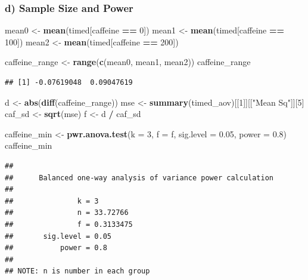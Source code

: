 \documentclass[
]{article}
\newenvironment{Shaded}{\begin{snugshade}}{\end{snugshade}}
\newcommand{\AttributeTok}[1]{\textcolor[rgb]{0.13,0.29,0.53}{#1}}
\newcommand{\DecValTok}[1]{\textcolor[rgb]{0.00,0.00,0.81}{#1}}
\newcommand{\FloatTok}[1]{\textcolor[rgb]{0.00,0.00,0.81}{#1}}
\newcommand{\FunctionTok}[1]{\textcolor[rgb]{0.13,0.29,0.53}{\textbf{#1}}}
\newcommand{\NormalTok}[1]{#1}
\newcommand{\OtherTok}[1]{\textcolor[rgb]{0.56,0.35,0.01}{#1}}
\newcommand{\SpecialCharTok}[1]{\textcolor[rgb]{0.81,0.36,0.00}{\textbf{#1}}}
\newcommand{\StringTok}[1]{\textcolor[rgb]{0.31,0.60,0.02}{#1}}
\begin{document}
\subsubsection{d) Sample Size and Power}\label{d-sample-size-and-power}

\begin{Shaded}
\begin{Highlighting}[]
\NormalTok{mean0 }\OtherTok{\textless{}{-}} \FunctionTok{mean}\NormalTok{(timed[caffeine }\SpecialCharTok{==} \DecValTok{0}\NormalTok{])}
\NormalTok{mean1 }\OtherTok{\textless{}{-}} \FunctionTok{mean}\NormalTok{(timed[caffeine }\SpecialCharTok{==} \DecValTok{100}\NormalTok{])}
\NormalTok{mean2 }\OtherTok{\textless{}{-}} \FunctionTok{mean}\NormalTok{(timed[caffeine }\SpecialCharTok{==} \DecValTok{200}\NormalTok{])}

\NormalTok{caffeine\_range }\OtherTok{\textless{}{-}} \FunctionTok{range}\NormalTok{(}\FunctionTok{c}\NormalTok{(mean0, mean1, mean2))}
\NormalTok{caffeine\_range}
\end{Highlighting}
\end{Shaded}

\begin{verbatim}
## [1] -0.07619048  0.09047619
\end{verbatim}

\begin{Shaded}
\begin{Highlighting}[]
\NormalTok{d }\OtherTok{\textless{}{-}} \FunctionTok{abs}\NormalTok{(}\FunctionTok{diff}\NormalTok{(caffeine\_range))}
\NormalTok{mse }\OtherTok{\textless{}{-}} \FunctionTok{summary}\NormalTok{(timed\_aov)[[}\DecValTok{1}\NormalTok{]][[}\StringTok{"Mean Sq"}\NormalTok{]][}\DecValTok{5}\NormalTok{]}
\NormalTok{caf\_sd }\OtherTok{\textless{}{-}} \FunctionTok{sqrt}\NormalTok{(mse)}
\NormalTok{f }\OtherTok{\textless{}{-}}\NormalTok{ d }\SpecialCharTok{/}\NormalTok{ caf\_sd}

\NormalTok{caffeine\_min }\OtherTok{\textless{}{-}} \FunctionTok{pwr.anova.test}\NormalTok{(}\AttributeTok{k =} \DecValTok{3}\NormalTok{, }\AttributeTok{f =}\NormalTok{ f, }\AttributeTok{sig.level =} \FloatTok{0.05}\NormalTok{, }\AttributeTok{power =} \FloatTok{0.8}\NormalTok{)}
\NormalTok{caffeine\_min}
\end{Highlighting}
\end{Shaded}

\begin{verbatim}
## 
##      Balanced one-way analysis of variance power calculation 
## 
##               k = 3
##               n = 33.72766
##               f = 0.3133475
##       sig.level = 0.05
##           power = 0.8
## 
## NOTE: n is number in each group
\end{verbatim}
\end{document}
